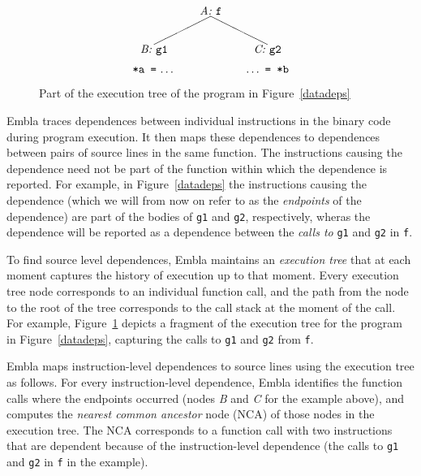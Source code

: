 \begin{figure} \small
\hrulefill
\[
\begin{picture}(160,60)(70,15)
\put(120,65){\makebox(60,10)[c]{\it A:\ \tt f}}
\put(150,65){\line(-2,-1){50}}
\put(150,65){\line( 2,-1){50}}
\put(170,30){\makebox(60,10)[c]{\it C:\ \tt g2}}
\put(70,30){\makebox(60,10)[c]{\it B:\ \tt g1}}
\put(70,15){\makebox(60,10)[cb]{{\tt *a\ =}\ \ldots}}
\put(170,15){\makebox(60,10)[cb]{\ldots\ {\tt =\ *b}}}
\end{picture}
\]
\hrulefill
\caption{Part of the execution tree of the program in Figure~\ref{datadeps}
} 
\label{ffextree}
\end{figure}

Embla traces dependences between individual instructions in the binary
code during program execution. It then maps these dependences to 
dependences between pairs of source lines in the same function. The
instructions causing the dependence need not be part of the function 
within which the dependence is reported. For example, in 
Figure~\ref{datadeps} the instructions causing the dependence (which we
will from now on refer to as the {\em endpoints} of the dependence) 
are part of the bodies of {\tt g1} and {\tt g2}, respectively, wheras the dependence 
will be reported as a dependence between the {\em calls to} {\tt g1} and 
{\tt g2} in {\tt f}.

To find source level dependences, Embla maintains an {\em execution tree} 
that at each moment captures 
the history of execution up to that moment. Every execution tree node 
corresponds to an
individual function call, and the path from the node to the root of the
tree corresponds to the call stack at the moment of the call. For
example, Figure~\ref{ffextree} depicts a fragment of the execution tree
for the program in Figure~\ref{datadeps}, capturing the calls to {\tt g1} 
and {\tt g2} from {\tt f}.

Embla maps instruction-level dependences to source lines
 using the execution tree as follows. For
every instruction-level dependence, Embla identifies the function calls
where the endpoints occurred (nodes {\it B} and {\it C} for the example
above), and computes the {\em nearest common ancestor} node (NCA) of
those nodes in the execution tree. The NCA corresponds to a function
call with two instructions that are dependent because of
the instruction-level dependence (the calls to {\tt g1} and {\tt g2} in 
{\tt f} in the example).


